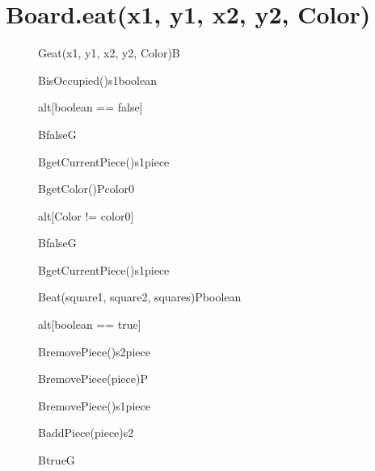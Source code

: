 \documentclass[8pt]{article}
\begin{document}
\section{Board.eat(x1, y1, x2, y2, Color)}
\begin{figure}[H]
	\centering
  	\begin{adjustbox}{width=\textwidth}
		\begin{sequencediagram}
			
			\begin{messcall}{G}{eat(x1, y1, x2, y2, Color)}{B}{}	
				\begin{call}{B}{isOccupied()}{s1}{boolean}
				\end{call}
				\begin{sdblock}{alt}{[boolean == false]}
					\begin{messcall}{B}{false}{G}
					\end{messcall} 					  		
				\end{sdblock}
				
				\begin{call}{B}{getCurrentPiece()}{s1}{piece}
				\end{call}
				\begin{call}{B}{getColor()}{P}{color0}
				\end{call}
				\begin{sdblock}{alt}{[Color != color0]}
					\begin{messcall}{B}{false}{G}
					\end{messcall} 					  		
				\end{sdblock}
				
				\begin{call}{B}{getCurrentPiece()}{s1}{piece}
				\end{call}
				\begin{call}{B}{eat(square1, square2, squares)}{P}{boolean}
				\end{call}
				\begin{sdblock}{alt}{[boolean == true]}
				    \begin{call}{B}{removePiece()}{s2}{piece}
				    \end{call}
				    \begin{call}{B}{removePiece(piece)}{P}{}
					\end{call}
					\begin{call}{B}{removePiece()}{s1}{piece}
					\end{call}
					\begin{call}{B}{addPiece(piece)}{s2}{}
					\end{call}
					\begin{messcall}{B}{true}{G}
					\end{messcall} 	
				\end{sdblock}
				

\end{messcall}
\end{sequencediagram}
\end{adjustbox}
\end{figure}
\end{document}
